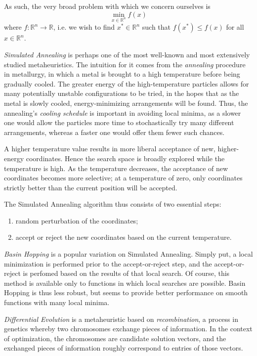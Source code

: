 \documentclass[12pt]{article}
\begin{document}
    As such, the very broad problem with which we concern ourselves is
    $$
    \min_{x \in \mathbb{R}^n} f(x)
    $$
    where $f : \mathbb{R}^n \to \mathbb{R}$,
    i.e. we wish to find $x^* \in \mathbb{R}^n$
    such that $f(x^*) \leq f(x)$ for all $x \in \mathbb{R}^n$.

    \emph{Simulated Annealing}\cite{kirkpatrick1983} is perhaps one of the most
    well-known and most extensively studied metaheuristics.
    The intuition for it comes from the \emph{annealing} procedure in
    metallurgy, in which a metal is brought to a high temperature before being
    gradually cooled.
    The greater energy of the high-temperature particles allows for many
    potentially unstable configurations to be tried, in the hopes that as the
    metal is slowly cooled, energy-minimizing arrangements will be found.
    Thus, the annealing's \emph{cooling schedule} is important in avoiding
    local minima, as a slower one would allow the particles more time to
    stochastically try many different arrangements, whereas a faster one would
    offer them fewer such chances.

    A higher temperature value results in more liberal acceptance of new,
    higher-energy coordinates.
    Hence the search space is broadly explored while the temperature is high.
    As the temperature decreases, the acceptance of new coordinates becomes
    more selective; at a temperature of zero, only coordinates strictly better
    than the current position will be accepted.

    The Simulated Annealing algorithm thus consists of two essential steps:
    \begin{enumerate}
        \item random perturbation of the coordinates;
        \item accept or reject the new coordinates based on the current
            temperature.
    \end{enumerate}

    \emph{Basin Hopping}\cite{wales1997} is a popular variation on Simulated
    Annealing.
    Simply put, a local minimization is performed prior to the accept-or-reject
    step, and the accept-or-reject is perfomed based on the results of that
    local search.
    Of course, this method is available only to functions in which local
    searches are possible.
    Basin Hopping is thus less robust, but seems to provide better performance
    on smooth functions with many local minima.

    \emph{Differential Evolution}\cite{storn1997} is a metaheuristic based on
    \emph{recombination}, a process in genetics whereby two chromosomes
    exchange pieces of information.
    In the context of optimization, the chromosomes are candidate solution
    vectors, and the exchanged pieces of information roughly correspond to
    entries of those vectors.
\end{document}
